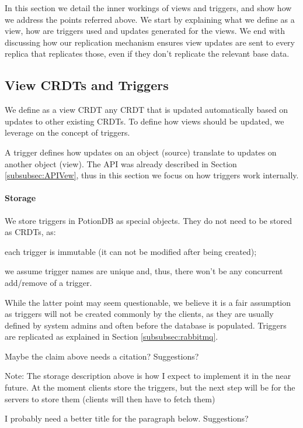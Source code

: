 \documentclass{vldb}
\newcommand{\grumbler}[2]{{\color{red}{\bf #1:} #2}}
\newcommand{\andre}[1]{\grumbler{andre}{#1}}
\begin{document}
In this section we detail the inner workings of views and triggers, and show how we address the points referred above.
We start by explaining what we define as a view, how are triggers used and updates generated for the views.
We end with discussing how our replication mechanism ensures view updates are sent to every replica that replicates those, even if they don't replicate the relevant base data.

\subsection{View CRDTs and Triggers}

We define as a view CRDT any CRDT that is updated automatically based on updates to other existing CRDTs.
To define how views should be updated, we leverage on the concept of triggers.

A trigger defines how updates on an object (source) translate to updates on another object (view).
The API was already described in Section \ref{subsubsec:APIVew}, thus in this section we focus on how triggers work internally.

\paragraph{Storage}We store triggers in PotionDB as special objects.
They do not need to be stored as CRDTs, as:
\begin{enumerate*}[label=(\roman*)]
	\item each trigger is immutable (it can not be modified after being created);
	\item we assume trigger names are unique and, thus, there won't be any concurrent add/remove of a trigger.
\end{enumerate*}
While the latter point may seem questionable, we believe it is a fair assumption as triggers will not be created commonly by the clients, as they are usually defined by system admins and often before the database is populated.
Triggers are replicated as explained in Section \ref{subsubsec:rabbitmq}.

\andre{Maybe the claim above needs a citation? Suggestions?}

\andre{Note: The storage description above is how I expect to implement it in the near future. At the moment clients store the triggers, but the next step will be for the servers to store them (clients will then have to fetch them)}

\andre{I probably need a better title for the paragraph below. Suggestions?}
\end{document}
